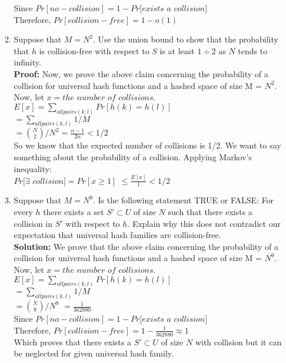 \documentclass[12pt]{article}
\begin{document}
\begin{enumerate}
\begin{enumerate}
Since $ Pr[no-collision] = 1 - Pr[exists$ $a$ $collision] $ \\
Therefore, $ Pr[collision-free] = 1 - o(1) $
\item Suppose that $M = N^2$. Use the union bound to show that the probability that $h$ is collision-free with respect to $S$ is at least $1 \div 2$ as $N$ tends to infinity.\\
 \textbf{Proof:}  
 Now, we prove the above claim concerning the probability of a collision for universal hash functions and a hashed space of size M = $N^{2}$. \\
 Now, let $x = the$ $number$ $of$ $collisions.$ \\
 $\displaystyle{ E[x] = \sum_{all pairs (k,l)} Pr[h(k) = h(l)] }$ \\
 $\displaystyle{      = \sum_{all pairs (k,l)} 1/M }$ \\
 $\displaystyle{      = {N \choose 2}/N^{2} = \frac{n-1}{2n} < 1/2 }$ \\
 So we know that the expected number of collisions is 1/2. We want to say something about the probability of a collision. Applying Markov’s inequality: \\
 $\displaystyle{ Pr[\exists}$ $\displaystyle{collision] = Pr[x\ge1] }$ 
 $\displaystyle{                       \le \frac{E[x]}{1} < 1/2 }$
\item Suppose that $M = N^9$. Is the following statement TRUE or FALSE: For every
$h$ there exists a set $S' \subset U$ of size $N$ such that there exists a collision in $S'$ with respect to $h$. Explain why this does not contradict our expectation that universal hash families are collision-free.\\
\textbf{Solution:} We prove that the above claim concerning the probability of a collision for universal hash functions and a hashed space of size M = $N^{9}$. \\
Now, let $x = the$ $number$ $of$ $collisions.$ \\
$\displaystyle{ E[x] = \sum_{all pairs (k,l)} Pr[h(k) = h(l)] }$ \\
$\displaystyle{      = \sum_{all pairs (k,l)} 1/M }$ \\
$\displaystyle{      = {N\choose9}/N^{9}} $
$\displaystyle{     = \frac{1}{362880}}$ \\
Since $ Pr[no-collision] = 1 - Pr[exists$ $a$ $collision] $ \\
Therefore, $ Pr[collision-free] = 1 - \frac{1}{362880}  \approx 1 $		\\
Which proves that there exists a $S' \subset U$ of size $N$ with collision but it can be neglected for given universal hash family.\\

\end{enumerate}
\end{enumerate}
\end{document}
